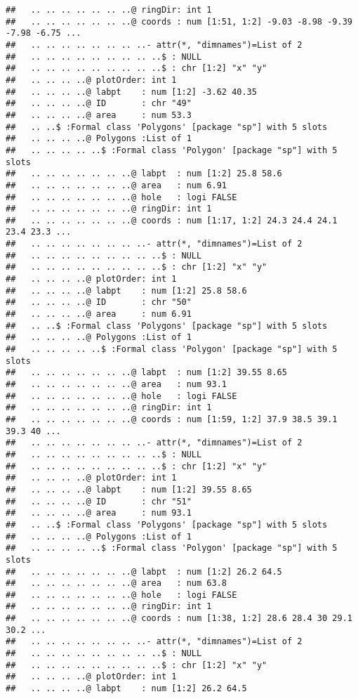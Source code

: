 \documentclass[]{article}
\begin{document}
\begin{verbatim}
##   .. .. .. .. .. .. ..@ ringDir: int 1
##   .. .. .. .. .. .. ..@ coords : num [1:51, 1:2] -9.03 -8.98 -9.39 -7.98 -6.75 ...
##   .. .. .. .. .. .. .. ..- attr(*, "dimnames")=List of 2
##   .. .. .. .. .. .. .. .. ..$ : NULL
##   .. .. .. .. .. .. .. .. ..$ : chr [1:2] "x" "y"
##   .. .. .. ..@ plotOrder: int 1
##   .. .. .. ..@ labpt    : num [1:2] -3.62 40.35
##   .. .. .. ..@ ID       : chr "49"
##   .. .. .. ..@ area     : num 53.3
##   .. ..$ :Formal class 'Polygons' [package "sp"] with 5 slots
##   .. .. .. ..@ Polygons :List of 1
##   .. .. .. .. ..$ :Formal class 'Polygon' [package "sp"] with 5 slots
##   .. .. .. .. .. .. ..@ labpt  : num [1:2] 25.8 58.6
##   .. .. .. .. .. .. ..@ area   : num 6.91
##   .. .. .. .. .. .. ..@ hole   : logi FALSE
##   .. .. .. .. .. .. ..@ ringDir: int 1
##   .. .. .. .. .. .. ..@ coords : num [1:17, 1:2] 24.3 24.4 24.1 23.4 23.3 ...
##   .. .. .. .. .. .. .. ..- attr(*, "dimnames")=List of 2
##   .. .. .. .. .. .. .. .. ..$ : NULL
##   .. .. .. .. .. .. .. .. ..$ : chr [1:2] "x" "y"
##   .. .. .. ..@ plotOrder: int 1
##   .. .. .. ..@ labpt    : num [1:2] 25.8 58.6
##   .. .. .. ..@ ID       : chr "50"
##   .. .. .. ..@ area     : num 6.91
##   .. ..$ :Formal class 'Polygons' [package "sp"] with 5 slots
##   .. .. .. ..@ Polygons :List of 1
##   .. .. .. .. ..$ :Formal class 'Polygon' [package "sp"] with 5 slots
##   .. .. .. .. .. .. ..@ labpt  : num [1:2] 39.55 8.65
##   .. .. .. .. .. .. ..@ area   : num 93.1
##   .. .. .. .. .. .. ..@ hole   : logi FALSE
##   .. .. .. .. .. .. ..@ ringDir: int 1
##   .. .. .. .. .. .. ..@ coords : num [1:59, 1:2] 37.9 38.5 39.1 39.3 40 ...
##   .. .. .. .. .. .. .. ..- attr(*, "dimnames")=List of 2
##   .. .. .. .. .. .. .. .. ..$ : NULL
##   .. .. .. .. .. .. .. .. ..$ : chr [1:2] "x" "y"
##   .. .. .. ..@ plotOrder: int 1
##   .. .. .. ..@ labpt    : num [1:2] 39.55 8.65
##   .. .. .. ..@ ID       : chr "51"
##   .. .. .. ..@ area     : num 93.1
##   .. ..$ :Formal class 'Polygons' [package "sp"] with 5 slots
##   .. .. .. ..@ Polygons :List of 1
##   .. .. .. .. ..$ :Formal class 'Polygon' [package "sp"] with 5 slots
##   .. .. .. .. .. .. ..@ labpt  : num [1:2] 26.2 64.5
##   .. .. .. .. .. .. ..@ area   : num 63.8
##   .. .. .. .. .. .. ..@ hole   : logi FALSE
##   .. .. .. .. .. .. ..@ ringDir: int 1
##   .. .. .. .. .. .. ..@ coords : num [1:38, 1:2] 28.6 28.4 30 29.1 30.2 ...
##   .. .. .. .. .. .. .. ..- attr(*, "dimnames")=List of 2
##   .. .. .. .. .. .. .. .. ..$ : NULL
##   .. .. .. .. .. .. .. .. ..$ : chr [1:2] "x" "y"
##   .. .. .. ..@ plotOrder: int 1
##   .. .. .. ..@ labpt    : num [1:2] 26.2 64.5

\end{verbatim}
\end{document}
